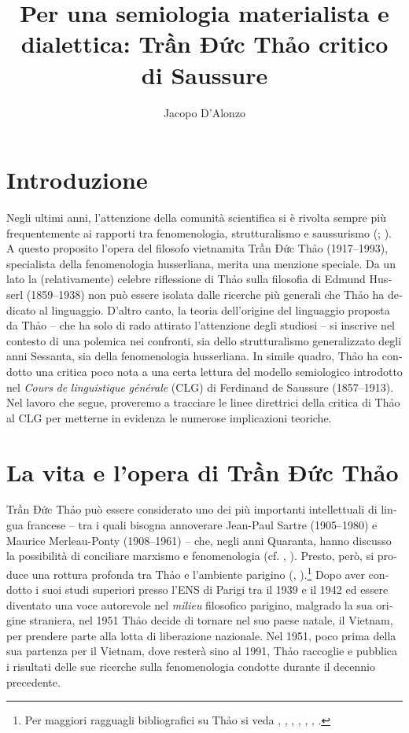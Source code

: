 \documentclass[italian,output=paper,colorlinks,citecolor=brown]{../langscibook}
\author{Jacopo D’Alonzo\affiliation{Sapienza Università di Roma}\orcid{}}
\title{Per una semiologia materialista e dialettica: Trần Đức Thảo critico di Saussure}
\begin{document}
\begin{otherlanguage}{italian}
\renewcommand{\chapappifchapterprefix}{Chapter}
\maketitle

\section{Introduzione} 

 Negli ultimi anni, l’attenzione della comunità scientifica si è rivolta sempre più frequentemente ai rapporti tra fenomenologia, strutturalismo e saussurismo (\citealt{De-Palo2016Italian}; \citealt{Aurora2017}). A questo proposito l’opera del filosofo vietnamita Trần Đức Thảo (1917--1993), specialista della fenomenologia husserliana, merita una menzione speciale. Da un lato la (relativamente) celebre riflessione di Thảo sulla filosofia di Edmund Husserl (1859--1938) non può essere isolata dalle ricerche più generali che Thảo ha dedicato al linguaggio. D’altro canto, la teoria dell’origine del linguaggio proposta da Thảo – che ha solo di rado attirato l’attenzione degli studiosi – si inscrive nel contesto di una polemica nei confronti, sia dello strutturalismo generalizzato degli anni Sessanta, sia della fenomenologia husserliana. In simile quadro, Thảo ha condotto una critica poco nota a una certa lettura del modello semiologico introdotto nel \textit{Cours} \textit{de} \textit{linguistique} \textit{générale} (CLG) di Ferdinand de Saussure (1857--1913). Nel lavoro che segue, proveremo a tracciare le linee direttrici della critica di Thảo al CLG per metterne in evidenza le numerose implicazioni teoriche.

\section{La vita e l’opera di Trần Đức Thảo} 

Trần Đức Thảo può essere considerato uno dei più importanti intellettuali di lingua francese – tra i quali bisogna annoverare Jean-Paul Sartre (1905--1980) e Maurice Merleau-Ponty (1908--1961) – che, negli anni Quaranta, hanno discusso la possibilità di conciliare marxismo e fenomenologia (cf. \citealt{Thao1946}, \citeyear{Thao1949}). Presto, però, si produce una rottura profonda tra Thảo e l’ambiente parigino (\citealt{Thao1950}, \citeyear{Thao1951}).\footnote{ \textrm{Per maggiori ragguagli bibliografici su Thảo si veda \citet[1--11]{Thao1991}, \citet{Thao1993}, \citet{Giao1988}, \citet{Hémery2013}, \citet{Thao2004}, \citet{Thao2013}, \citet{Feron2014}.}} Dopo aver condotto i suoi studi superiori presso l’ENS di Parigi tra il 1939 e il 1942 ed essere diventato una voce autorevole nel \textit{milieu} filosofico parigino, malgrado la sua origine straniera, nel 1951 Thảo decide di tornare nel suo paese natale, il Vietnam, per prendere parte alla lotta di liberazione nazionale. Nel 1951, poco prima della sua partenza per il Vietnam, dove resterà sino al 1991, Thảo raccoglie e pubblica i risultati delle sue ricerche sulla fenomenologia condotte durante il decennio precedente. 


\end{otherlanguage}
\end{document}
